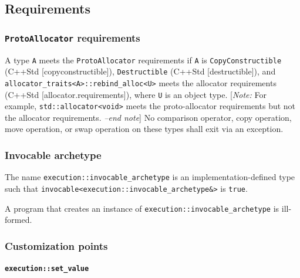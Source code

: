 \documentclass[a4paper,12pt,notitlepage,twoside,openright]{article}
\begin{document}
\hypertarget{requirements}{%
\subsection{Requirements}\label{requirements}}

\hypertarget{protoallocator-requirements}{%
\subsubsection{\texorpdfstring{\texttt{ProtoAllocator}
requirements}{ requirements}}\label{protoallocator-requirements}}

A type \texttt{A} meets the
\texttt{ProtoAllocator} requirements if
\texttt{A} is \texttt{CopyConstructible} (C++Std
{[}copyconstructible{]}), \texttt{Destructible} (C++Std
{[}destructible{]}), and
\texttt{allocator_traits<A>::rebind_alloc<U>} meets the
allocator requirements (C++Std {[}allocator.requirements{]}), where
\texttt{U} is an object type. {[}\emph{Note:} For example,
\texttt{std::allocator<void>} meets the proto-allocator
requirements but not the allocator requirements. \emph{--end note}{]} No
comparison operator, copy operation, move operation, or swap operation
on these types shall exit via an exception.

\hypertarget{invocable-archetype}{%
\subsubsection{Invocable archetype}\label{invocable-archetype}}

The name \texttt{execution::invocable_archetype} is an
implementation-defined type such that
\texttt{invocable<execution::invocable_archetype&>} is
\texttt{true}.

A program that creates an instance of
\texttt{execution::invocable_archetype} is ill-formed.

\hypertarget{customization-points}{%
\subsubsection{Customization points}\label{customization-points}}

\hypertarget{executionset_value}{%
\paragraph{\texorpdfstring{\texttt{execution::set_value}}{}}\label{executionset_value}}
\end{document}
